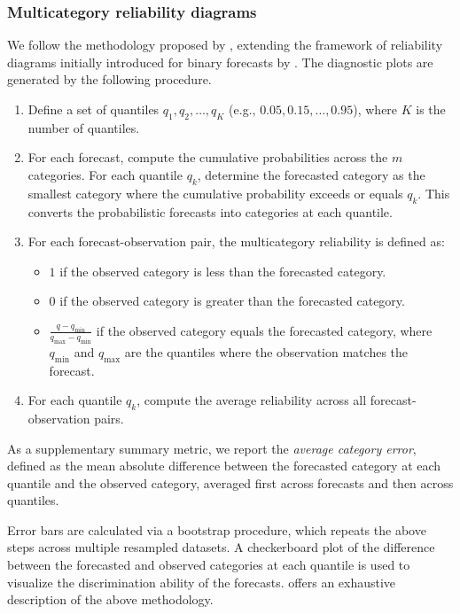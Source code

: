 \documentclass{article}
\begin{document}
\subsubsection{Multicategory reliability diagrams}
We follow the methodology proposed by \citet{hamill1997}, extending the framework of reliability diagrams initially introduced for binary forecasts by \citet{wilks1995a}.
The diagnostic plots are generated by the following procedure.
\begin{enumerate}    
    \item Define a set of quantiles $q_1, q_2, \dots, q_K$ (e.g., $0.05, 0.15, \dots, 0.95$), where $K$ is the number of quantiles.
    \item For each forecast, compute the cumulative probabilities across the $m$ categories. For each quantile $q_k$, determine the forecasted category as the smallest category where the cumulative probability exceeds or equals $q_k$. This converts the probabilistic forecasts into categories at each quantile.
    \item For each forecast-observation pair, the multicategory reliability is defined as:
    \begin{itemize}
        \item $1$ if the observed category is less than the forecasted category.
        \item $0$ if the observed category is greater than the forecasted category.
        \item $\frac{q - q_{\min}}{q_{\max} - q_{\min}}$ if the observed category equals the forecasted category, where $q_{\min}$ and $q_{\max}$ are the quantiles where the observation matches the forecast.
    \end{itemize}
    \item For each quantile $q_k$, compute the average reliability across all forecast-observation pairs.
\end{enumerate}
As a supplementary summary metric, we report the \textit{average category error}, defined as the mean absolute difference between the forecasted category at each quantile and the observed category, averaged first across forecasts and then across quantiles.

Error bars are calculated via a bootstrap procedure, which repeats the above steps across multiple resampled datasets. A checkerboard plot of the difference between the forecasted and observed categories at each quantile is used to visualize the discrimination ability of the forecasts. \citet{hamill1997} offers an exhaustive description of the above methodology.
\end{document}
